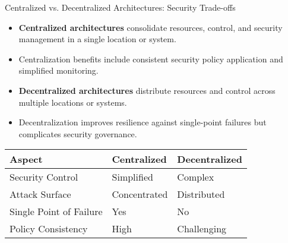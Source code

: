 \documentclass{beamer}
\begin{document}
            \begin{frame}{Centralized vs. Decentralized Architectures: Security Trade-offs}
            \begin{itemize}
            \item \textbf{Centralized architectures} consolidate resources, control, and security management in a single location or system.
            \item Centralization benefits include consistent security policy application and simplified monitoring.
            \item \textbf{Decentralized architectures} distribute resources and control across multiple locations or systems.
            \item Decentralization improves resilience against single-point failures but complicates security governance.
            \end{itemize}
            
            \begin{table}
            \begin{tabular}{lll}
            \toprule
            \textbf{Aspect} & \textbf{Centralized} & \textbf{Decentralized} \\
            \midrule
            Security Control & Simplified & Complex \\
            Attack Surface & Concentrated & Distributed \\
            Single Point of Failure & Yes & No \\
            Policy Consistency & High & Challenging \\
            \bottomrule
            \end{tabular}
            \end{table}
            \end{frame}
            
\end{document}
